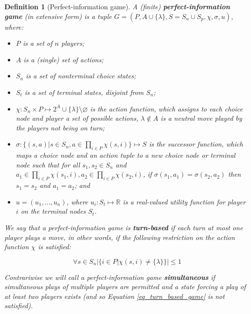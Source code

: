 \newtheorem*{defgpig}{Definition}
\begin{defgpig}[Perfect-information game]

A (finite) \textbf{perfect-information game} (in extensive form) is a tuple $G =
(P,A\cup\{\lambda\},S=S_n\cup S_p,\chi,\sigma,u)$, where:

\begin{itemize}

\item $P$ is a set of $n$ players;

\item $A$ is a (single) set of actions;

\item $S_n$ is a set of nonterminal choice states;

\item $S_t$ is a set of terminal states, disjoint from $S_n$;

\item $\chi: S_n \times P \mapsto 2^A \cup \{\lambda\} \setminus \varnothing$ is the action 
 function, which assigns to each choice node and player a set of possible actions, $\lambda \notin
 A$ is a neutral move played by the players not being on turn;

\item $\sigma: \{(s,a)| s \in S_n, a \in \prod\limits_{i\in P}\chi(s,i)\} \mapsto S$ is the
successor function, which maps a choice node and an action tuple to a new choice node or
terminal node such that for all $s_1, s_2 \in S_n$ and $a_1 \in \prod\limits_{i\in
P}\chi(s_1,i), a_2 \in \prod\limits_{i\in P}\chi(s_2,i)$, if 
$\sigma(s_1,a_1) = \sigma(s_2,a_2)$ then $s_1=s_2$ and $a_1=a_2$; and

\item $u = (u_1,\ldots,u_n)$, where $u_i: S_t \mapsto \mathbb{R}$ is a real-valued utility
function for player $i$ on the terminal nodes $S_t$.

\end{itemize}

We say that a perfect-information game is \textbf{turn-based} if each turn at most one player plays a
move, in other words, if the following restriction on the action function $\chi$ is satisfied:

\begin{equation}
\label{eq_turn_based_game}
\forall s \in S_n |\{i \in P|\chi(s,i) \not= \{\lambda\}\}| \le 1
\end{equation}

Contrariwise we will call a perfect-information game \textbf{simultaneous} if simultaneous
plays of multiple players are permitted and a state forcing a play of at least two players
exists (and so Equation \ref{eq_turn_based_game} is not satisfied).

\end{defgpig}

